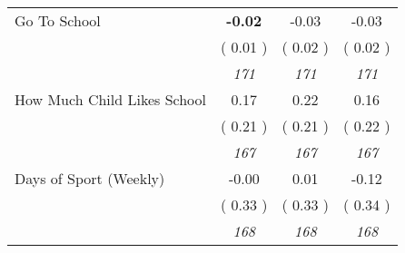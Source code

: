 \begin{tabular}{l c c c}
Go To School & \textbf{     -0.02 } &     -0.03 &     -0.03 \\
& (     0.01 ) & (     0.02 ) & (     0.02 ) \\
& \textit{ 171 } & \textit{ 171 } & \textit{ 171 } \\
How Much Child Likes School &      0.17 &      0.22 &      0.16 \\
& (     0.21 ) & (     0.21 ) & (     0.22 ) \\
& \textit{ 167 } & \textit{ 167 } & \textit{ 167 } \\
Days of Sport (Weekly) &     -0.00 &      0.01 &     -0.12 \\
& (     0.33 ) & (     0.33 ) & (     0.34 ) \\
& \textit{ 168 } & \textit{ 168 } & \textit{ 168 } \\
\bottomrule
\end{tabular}
